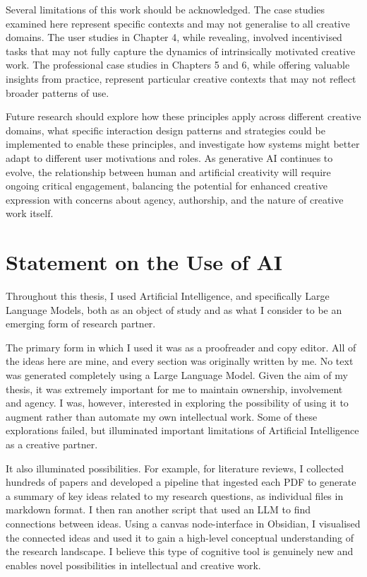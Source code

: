 Several limitations of this work should be acknowledged. The case studies examined here represent specific contexts and may not generalise to all creative domains. The user studies in Chapter 4, while revealing, involved incentivised tasks that may not fully capture the dynamics of intrinsically motivated creative work. The professional case studies in Chapters 5 and 6, while offering valuable insights from practice, represent particular creative contexts that may not reflect broader patterns of use.

Future research should explore how these principles apply across different creative domains, what specific interaction design patterns and strategies could be implemented to enable these principles, and investigate how systems might better adapt to different user motivations and roles. As generative AI continues to evolve, the relationship between human and artificial creativity will require ongoing critical engagement, balancing the potential for enhanced creative expression with concerns about agency, authorship, and the nature of creative work itself.

\section{Statement on the Use of AI}
Throughout this thesis, I used Artificial Intelligence, and specifically Large Language Models, both as an object of study and as what I consider to be an emerging form of research partner.

The primary form in which I used it was as a proofreader and copy editor. All of the ideas here are mine, and every section was originally written by me. No text was generated completely using a Large Language Model. Given the aim of my thesis, it was extremely important for me to maintain ownership, involvement and agency. I was, however, interested in exploring the possibility of using it to augment rather than automate my own intellectual work. Some of these explorations failed, but illuminated important limitations of Artificial Intelligence as a creative partner.

It also illuminated possibilities. For example, for literature reviews, I collected hundreds of papers and developed a pipeline that ingested each PDF to generate a summary of key ideas related to my research questions, as individual files in markdown format. I then ran another script that used an LLM to find connections between ideas. Using a canvas node-interface in Obsidian, I visualised the connected ideas and used it to gain a high-level conceptual understanding of the research landscape. I believe this type of cognitive tool is genuinely new and enables novel possibilities in intellectual and creative work.

